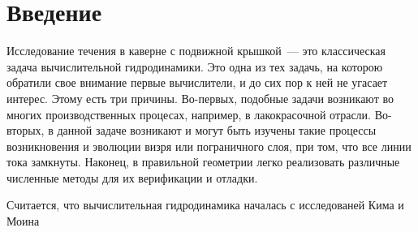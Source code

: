 \section*{Введение \cite{introduction}}

Исследование течения в каверне с подвижной крышкой~--- это классическая задача вычислительной гидродинамики. Это одна из тех задачь, на которою обратили свое внимание первые вычислители, и до сих пор к ней не угасает интерес. Этому есть три причины. Во-первых, подобные задачи возникают во многих производственных процесах, например, в лакокрасочной отрасли. Во-вторых, в данной задаче возникают и могут быть изучены такие процессы возникновения и эволюции визря или пограничного слоя, при том, что все линии тока замкнуты. Наконец, в правильной геометрии легко реализовать различные численные методы для их верификации и отладки.

Считается, что вычислительная гидродинамика началась с исследованей Кима и Моина \cite{KimMoin}

 
\newpage
